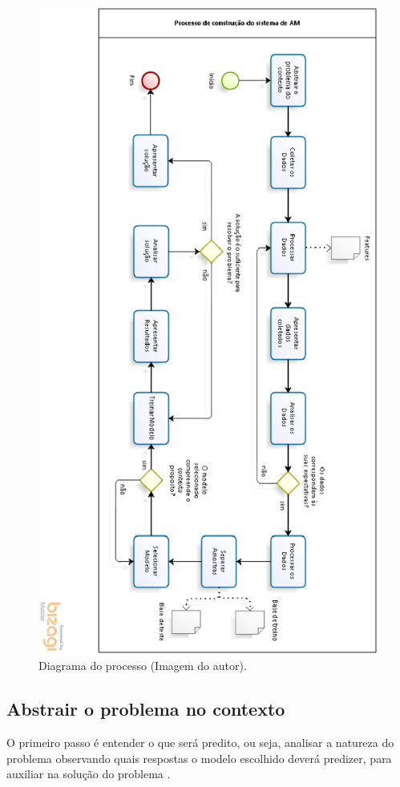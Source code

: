 \begin{figure}[h]
	\centering
	\includegraphics[width=1\textwidth]{figuras/ProcessoAM.eps}
	\caption{Diagrama do processo (Imagem do autor).}
	\label{ProcessoAM}
\end{figure}

\subsection{Abstrair o problema no contexto}
O primeiro passo é entender o que será predito, ou seja, analisar a natureza do problema observando quais respostas o modelo escolhido deverá predizer, para auxiliar na solução do problema \cite{geron2017hands}.

